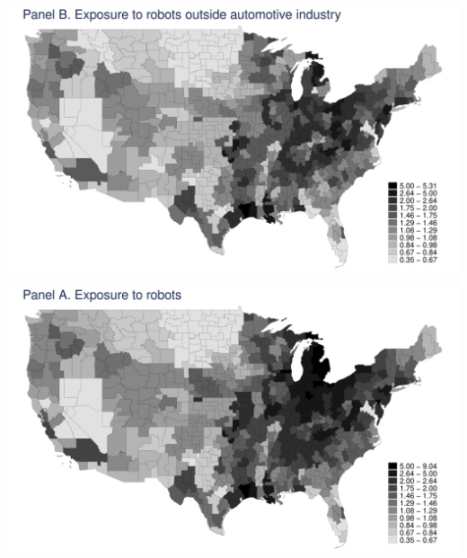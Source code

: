 \documentclass{article}
\begin{document}
\begin{center}\includegraphics[scale=0.15]{output/map_exposure_robots_nocar.png}\end{center}
\begin{center}\includegraphics[scale=0.15]{output/map_exposure_robots.png}\end{center}
\end{document}
